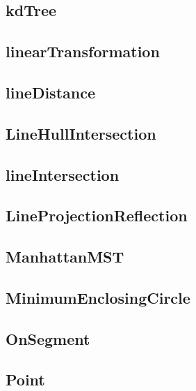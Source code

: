 \subsection{kdTree}
\raggedbottom
\hrulefill
\subsection{linearTransformation}
\raggedbottom
\hrulefill
\subsection{lineDistance}
\raggedbottom
\hrulefill
\subsection{LineHullIntersection}
\raggedbottom
\hrulefill
\subsection{lineIntersection}
\raggedbottom
\hrulefill
\subsection{LineProjectionReflection}
\raggedbottom
\hrulefill
\subsection{ManhattanMST}
\raggedbottom
\hrulefill
\subsection{MinimumEnclosingCircle}
\raggedbottom
\hrulefill
\subsection{OnSegment}
\raggedbottom
\hrulefill
\subsection{Point}
\raggedbottom
\hrulefill
